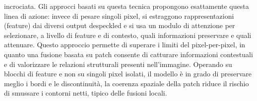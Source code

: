 incrociata. Gli approcci basati su questa tecnica propongono esattamente questa linea di azione: 
invece di pesare singoli pixel, si estraggono rappresentazioni (feature) dai diversi output despeckled e si usa un modulo 
di attenzione per selezionare, a livello di feature e di contesto, quali informazioni preservare e quali attenuare. 
Questo approccio permette di superare i limiti del pixel-per-pixel, in quanto una fusione basata su patch consente 
di catturare informazioni contestuali e di valorizzare le relazioni strutturali presenti nell’immagine. Operando 
su blocchi di feature e non su singoli pixel isolati, il modello è in grado di preservare meglio i bordi e le 
discontinuità, la coerenza spaziale della patch riduce il rischio di smussare i contorni netti, tipico delle 
fusioni locali.